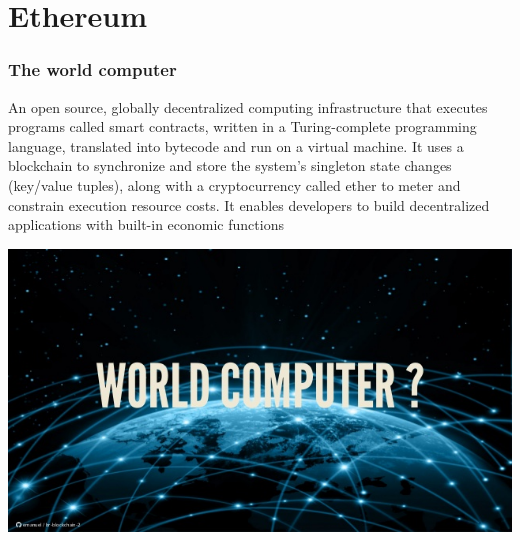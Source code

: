 \documentclass[11pt]{beamer}  %
\begin{document}
\section{Ethereum}

\begin{frame}
  \frametitle{The world computer}

  \begin{greenbox}{}
    An open source, globally \alert{decentralized computing infrastructure}
    that executes programs called \alert{smart contracts}, written
    in a \alert{Turing-complete} programming language, translated into
    bytecode and run on a \alert{virtual machine}. It uses a
    \alert{blockchain} to synchronize and store the system's \alert{singleton state} changes
    (key/value tuples), along
    with a cryptocurrency called \alert{ether} to \alert{meter and constrain}
    execution resource costs. It enables developers to build
    \alert{decentralized applications} with \alert{built-in economic functions}
  \end{greenbox}

  \begin{center}
    \includegraphics[scale=0.3,clip=false]{pictures/world-computer.jpg}
  \end{center}

\end{frame}
\end{document}

